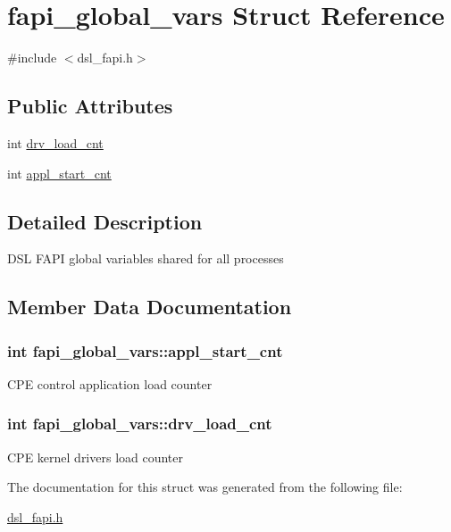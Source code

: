 \hypertarget{structfapi__global__vars}{\section{fapi\-\_\-global\-\_\-vars Struct Reference}
\label{structfapi__global__vars}
}


{\ttfamily \#include $<$dsl\-\_\-fapi.\-h$>$}

\subsection*{Public Attributes}
\begin{DoxyCompactItemize}
\item 
int \hyperlink{structfapi__global__vars_a0c92f4f92770759f8898dfdadc607dd2}{drv\-\_\-load\-\_\-cnt}
\item 
int \hyperlink{structfapi__global__vars_a72c08739f19e0037d10d327d349b437f}{appl\-\_\-start\-\_\-cnt}
\end{DoxyCompactItemize}


\subsection{Detailed Description}
D\-S\-L F\-A\-P\-I global variables shared for all processes 

\subsection{Member Data Documentation}
\hypertarget{structfapi__global__vars_a72c08739f19e0037d10d327d349b437f}{
\subsubsection[{appl\-\_\-start\-\_\-cnt}]{\setlength{\rightskip}{0pt plus 5cm}int fapi\-\_\-global\-\_\-vars\-::appl\-\_\-start\-\_\-cnt}}\label{structfapi__global__vars_a72c08739f19e0037d10d327d349b437f}
C\-P\-E control application load counter \hypertarget{structfapi__global__vars_a0c92f4f92770759f8898dfdadc607dd2}{
\subsubsection[{drv\-\_\-load\-\_\-cnt}]{\setlength{\rightskip}{0pt plus 5cm}int fapi\-\_\-global\-\_\-vars\-::drv\-\_\-load\-\_\-cnt}}\label{structfapi__global__vars_a0c92f4f92770759f8898dfdadc607dd2}
C\-P\-E kernel drivers load counter 

The documentation for this struct was generated from the following file\-:\begin{DoxyCompactItemize}
\item 
\hyperlink{dsl__fapi_8h}{dsl\-\_\-fapi.\-h}\end{DoxyCompactItemize}
